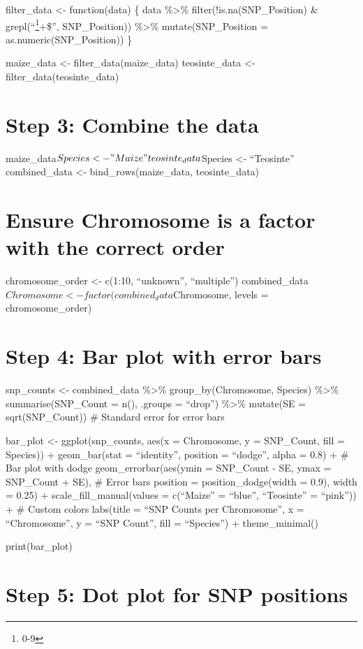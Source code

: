 \documentclass[
]{article}
\begin{document}
filter\_data \textless- function(data) \{ data \%\textgreater\%
filter(!is.na(SNP\_Position) \& grepl(``\footnote{0-9}+\$'',
SNP\_Position)) \%\textgreater\% mutate(SNP\_Position =
as.numeric(SNP\_Position)) \}

maize\_data \textless- filter\_data(maize\_data) teosinte\_data
\textless- filter\_data(teosinte\_data)

\section{Step 3: Combine the data}\label{step-3-combine-the-data}

maize\_data\(Species <- "Maize"
teosinte_data\)Species \textless- ``Teosinte'' combined\_data \textless-
bind\_rows(maize\_data, teosinte\_data)

\section{Ensure Chromosome is a factor with the correct
order}\label{ensure-chromosome-is-a-factor-with-the-correct-order}

chromosome\_order \textless- c(1:10, ``unknown'', ``multiple'')
combined\_data\(Chromosome <- factor(combined_data\)Chromosome, levels =
chromosome\_order)

\section{Step 4: Bar plot with error
bars}\label{step-4-bar-plot-with-error-bars}

snp\_counts \textless- combined\_data \%\textgreater\%
group\_by(Chromosome, Species) \%\textgreater\% summarise(SNP\_Count =
n(), .groups = ``drop'') \%\textgreater\% mutate(SE = sqrt(SNP\_Count))
\# Standard error for error bars

bar\_plot \textless- ggplot(snp\_counts, aes(x = Chromosome, y =
SNP\_Count, fill = Species)) + geom\_bar(stat = ``identity'', position =
``dodge'', alpha = 0.8) + \# Bar plot with dodge geom\_errorbar(aes(ymin
= SNP\_Count - SE, ymax = SNP\_Count + SE), \# Error bars position =
position\_dodge(width = 0.9), width = 0.25) + scale\_fill\_manual(values
= c(``Maize'' = ``blue'', ``Teosinte'' = ``pink'')) + \# Custom colors
labs(title = ``SNP Counts per Chromosome'', x = ``Chromosome'', y =
``SNP Count'', fill = ``Species'') + theme\_minimal()

print(bar\_plot)

\section{Step 5: Dot plot for SNP
positions}\label{step-5-dot-plot-for-snp-positions}
\end{document}
